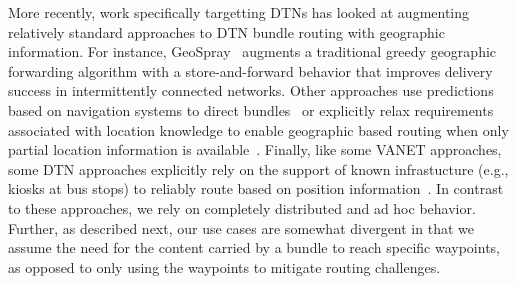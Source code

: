 More recently, work specifically targetting DTNs has looked at augmenting relatively standard approaches to DTN bundle routing with geographic information. For instance, GeoSpray~\cite{soares14:geospray} augments a traditional greedy geographic forwarding algorithm with a store-and-forward behavior that improves delivery success in intermittently connected networks. Other approaches use predictions based on navigation systems to direct bundles~\cite{cheng10:geodtn} or explicitly relax requirements associated with location knowledge to enable geographic based routing when only partial location information is available~\cite{kuiper11:geographical}. Finally, like some VANET approaches, some DTN approaches explicitly rely on the support of known infrastucture (e.g., kiosks at bus stops) to reliably route based on position information~\cite{park12:position}. In contrast to these approaches, we rely on completely distributed and ad hoc behavior. Further, as described next, our use cases are somewhat divergent in that we assume the need for the content carried by a bundle to reach specific waypoints, as opposed to only using the waypoints to mitigate routing challenges.